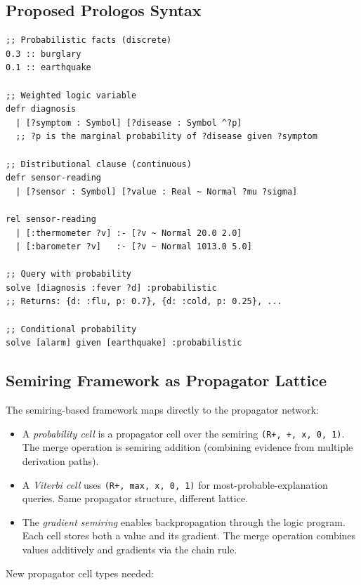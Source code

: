 \documentclass[11pt]{article}
\begin{document}
\subsection{Proposed Prologos Syntax}
\label{sec:orgc82a71b}

\begin{verbatim}
;; Probabilistic facts (discrete)
0.3 :: burglary
0.1 :: earthquake

;; Weighted logic variable
defr diagnosis
  | [?symptom : Symbol] [?disease : Symbol ^?p]
  ;; ?p is the marginal probability of ?disease given ?symptom

;; Distributional clause (continuous)
defr sensor-reading
  | [?sensor : Symbol] [?value : Real ~ Normal ?mu ?sigma]

rel sensor-reading
  | [:thermometer ?v] :- [?v ~ Normal 20.0 2.0]
  | [:barometer ?v]   :- [?v ~ Normal 1013.0 5.0]

;; Query with probability
solve [diagnosis :fever ?d] :probabilistic
;; Returns: {d: :flu, p: 0.7}, {d: :cold, p: 0.25}, ...

;; Conditional probability
solve [alarm] given [earthquake] :probabilistic
\end{verbatim}
\subsection{Semiring Framework as Propagator Lattice}
\label{sec:org382697a}

The semiring-based framework maps directly to the propagator network:

\begin{itemize}
\item A \emph{probability cell} is a propagator cell over the semiring \texttt{(R+, +, x, 0, 1)}.
The merge operation is semiring addition (combining evidence from multiple
derivation paths).

\item A \emph{Viterbi cell} uses \texttt{(R+, max, x, 0, 1)} for most-probable-explanation
queries. Same propagator structure, different lattice.

\item The \emph{gradient semiring} enables backpropagation through the logic program.
Each cell stores both a value and its gradient. The merge operation combines
values additively and gradients via the chain rule.
\end{itemize}

New propagator cell types needed:
\end{document}
